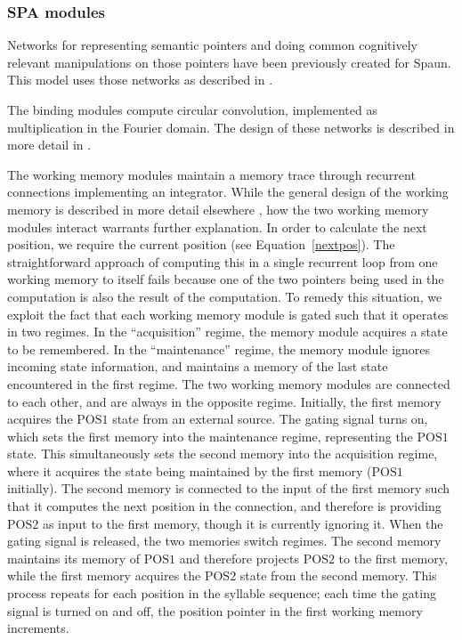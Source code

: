 \subsubsection{SPA modules}

Networks for representing semantic pointers
and doing common cognitively relevant
manipulations on those pointers
have been previously created
for Spaun.
This model uses those networks
as described in \citet{eliasmith2013}.

The binding modules compute
circular convolution,
implemented as multiplication
in the Fourier domain.
The design of these networks
is described in more detail in
\citet{choo2010}.

The working memory modules
maintain a memory trace
through recurrent connections
implementing an integrator.
While the general design of the working memory
is described in more detail elsewhere
\citep{choo2010},
how the two working memory modules
interact warrants further explanation.
In order to calculate the next position,
we require the current position
(see Equation~\eqref{nextpos}).
The straightforward approach
of computing this in a single recurrent loop
from one working memory to itself
fails because one of the two pointers
being used in the computation
is also the result of the computation.
To remedy this situation, we exploit the fact that
each working memory module is gated
such that it operates in two regimes.
In the ``acquisition'' regime,
the memory module acquires a state to be remembered.
In the ``maintenance'' regime,
the memory module ignores incoming state information,
and maintains a memory of the last state
encountered in the first regime.
The two working memory modules
are connected to each other,
and are always in the opposite regime.
Initially, the first memory
acquires the $\text{POS1}$ state
from an external source.
The gating signal turns on,
which sets the first memory
into the maintenance regime,
representing the $\text{POS1}$ state.
This simultaneously sets the second memory
into the acquisition regime,
where it acquires the state
being maintained by the first memory
($\text{POS1}$ initially).
The second memory is connected
to the input of the first memory
such that it computes the
next position in the connection,
and therefore is providing
$\text{POS2}$ as input to the first memory,
though it is currently ignoring it.
When the gating signal is released,
the two memories switch regimes.
The second memory maintains
its memory of $\text{POS1}$
and therefore projects $\text{POS2}$
to the first memory,
while the first memory acquires
the $\text{POS2}$ state from the second memory.
This process repeats for each position
in the syllable sequence;
each time the gating signal
is turned on and off,
the position pointer
in the first working memory increments.

